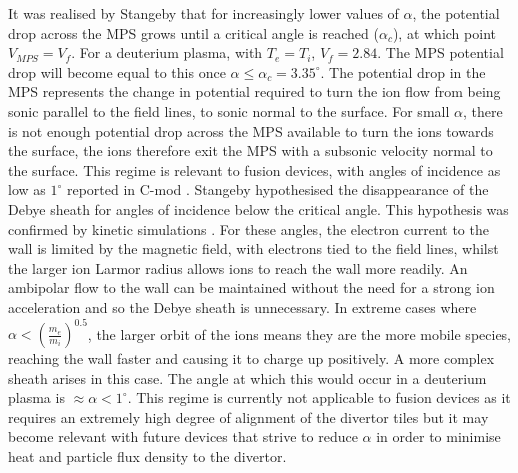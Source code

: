  It was realised by Stangeby \cite{stangeby-angles} that for increasingly lower values of $\alpha$, the potential drop across the MPS grows until a critical angle is reached ($\alpha_c$), at which point $V_{MPS} = V_f$. For a deuterium plasma, with $T_e = T_i$, $V_f = 2.84$. The MPS potential drop will become equal to this once $\alpha \leq \alpha_c =  {3.35}^{\circ}$. The potential drop in the MPS represents the change in potential required to turn the ion flow from being sonic parallel to the field lines, to sonic normal to the surface. For small $\alpha$, there is not enough potential drop across the MPS available to turn the ions towards the surface, the ions therefore exit the MPS with a subsonic velocity normal to the surface. This regime is relevant to fusion devices, with angles of incidence as low as ${1}^{\circ}$ reported in C-mod \cite{c-mod}. Stangeby hypothesised the disappearance of the Debye sheath for angles of incidence below the critical angle. This hypothesis was confirmed by kinetic simulations \cite{kinetic-sims}. For these angles, the electron current to the wall is limited by the magnetic field, with electrons tied to the field lines, whilst the larger ion Larmor radius allows ions to reach the wall more readily. An ambipolar flow to the wall can be maintained without the need for a strong ion acceleration and so the Debye sheath is unnecessary. In extreme cases where $\alpha < \left({\frac{m_e}{m_i}}\right)^{0.5}$, the larger orbit of the ions means they are the more mobile species, reaching the wall faster and causing it to charge up positively. A more complex sheath arises in this case. The angle at which this would occur in a deuterium plasma is $\approx \alpha < {1}^{\circ}$. This regime is currently not applicable to fusion devices as it requires an extremely high degree of alignment of the divertor tiles but it may become relevant with future devices that strive to reduce $\alpha$ in order to minimise heat and particle flux density to the divertor.
 
 
 
